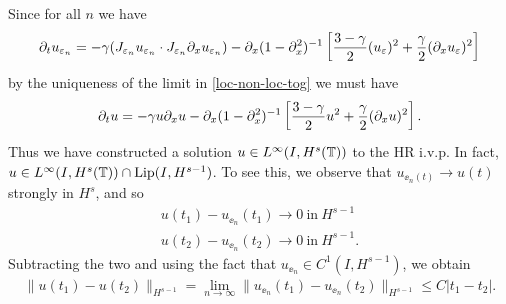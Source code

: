 %
Since for all $n$ we have 
%
\begin{equation}
\partial_tu_{\varepsilon_n} 
=
-\gamma (J_{\varepsilon_n} u_{\varepsilon_n}  \cdot
J_{\varepsilon_n}\partial_x u_{\varepsilon_n}) - \partial_x (1-
\partial_x^2)^{-1} \left
[\frac{3-\gamma}{2}(u_\varepsilon)^2 + \frac{\gamma}{2}(\partial_x u_\varepsilon)^2 \right ] 
\end{equation}
%
by the uniqueness  of the limit in \eqref{loc-non-loc-tog}
we must have
%
\begin{equation}
\label{1000y}
\partial_t u =- \gamma u \partial_x u- \partial_x (1- \partial_x^2)^{-1} \left
[\frac{3-\gamma}{2}u^2 + \frac{\gamma}{2}(\partial_x u)^2 \right ].
\end{equation}
%
Thus we have constructed a solution $u \in L^\infty(I, H^s(\mathbb{T}))$
to the HR i.v.p. In fact, $u \in L^{\infty}(I, H^{s}(\mathbb{T})) \cap \text{Lip}(I,
H^{s-1})$. To see this, we observe that $u_{\ee_{n}(t)} \to u(t)$ strongly in $H^{s}$, and so
%
%
\begin{gather*}
    u(t_{1})  - u_{\ee_{n}}(t_{1}) \to 0  \ \text{in} \ H^{s-1}
    \\
    u(t_{2}) - u_{\ee_{n}}(t_{2})  \to 0  \ \text{in} \ H^{s-1}.
\end{gather*}
%
%
Subtracting the two and using the fact that $u_{\ee_{n}} \in C^{1}(I,
H^{s-1})$, we obtain
%
%
\begin{equation*}
\begin{split}
    \| u(t_{1}) - u(t_{2}) \|_{H^{s-1}} = \lim_{n \to \infty} \| u_{\ee_{n}}(t_{1}) - u_{\ee_{n}}(t_{2}) \|_{H^{s-1}} \le C | t_{1} - t_{2} |.
\end{split}
\end{equation*}
%
%

%
%
%
%
%
%
%
